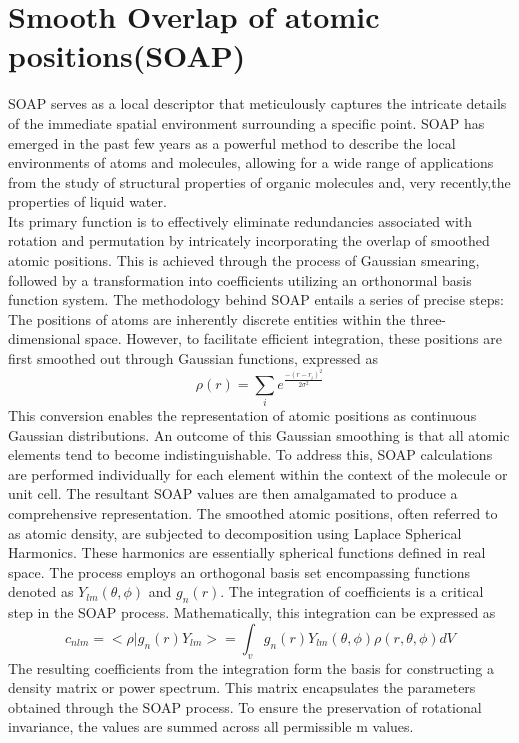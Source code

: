 \section{Smooth Overlap of atomic positions(SOAP)}
SOAP serves as a local descriptor that meticulously captures the intricate details of the immediate spatial environment surrounding a specific point.
SOAP has emerged in the past few years as a powerful method to describe the local environments of atoms and molecules, allowing for a wide range of applications from the study of structural properties of organic molecules \cite{De2016}\cite{Maksimov2020} and, very recently,the properties of liquid water\cite{Monserrat2020}\cite{Capelli2022}\cite{OffeiDanso2022}.\\
Its primary function is to effectively eliminate redundancies associated with rotation and permutation by intricately incorporating the overlap of smoothed atomic positions. This is achieved through the process of Gaussian smearing, followed by a transformation into coefficients utilizing an orthonormal basis function system\cite{Himanen2020}.
The methodology behind SOAP entails a series of precise steps:
The positions of atoms are inherently discrete entities within the three-dimensional space. However, to facilitate efficient integration, these positions are first smoothed out through Gaussian functions, expressed as
\[\rho(r)  = \sum_i e^{\frac {-(r-r_i)^2}{2\sigma^2}}\]
This conversion enables the representation of atomic positions as continuous Gaussian distributions.
An outcome of this Gaussian smoothing is that all atomic elements tend to become indistinguishable. To address this, SOAP calculations are performed individually for each element within the context of the molecule or unit cell. The resultant SOAP values are then amalgamated to produce a comprehensive representation.
The smoothed atomic positions, often referred to as atomic density, are subjected to decomposition using Laplace Spherical Harmonics. These harmonics are essentially spherical functions defined in real space. The process employs an orthogonal basis set encompassing functions denoted as $Y_{lm}(\theta,\phi)$ and $g_n(r)$.
The integration of coefficients is a critical step in the SOAP process. Mathematically, this integration can be expressed as
\[c_{nlm} = < \rho|g_n(r)Y_{lm}> = \int_v  g_n(r)Y_{lm}(\theta,\phi)\rho(r,\theta,\phi)dV \]
The resulting coefficients from the integration form the basis for constructing a density matrix or power spectrum. This matrix encapsulates the parameters obtained through the SOAP process. To ensure the preservation of rotational invariance, the values are summed across all permissible m values.
